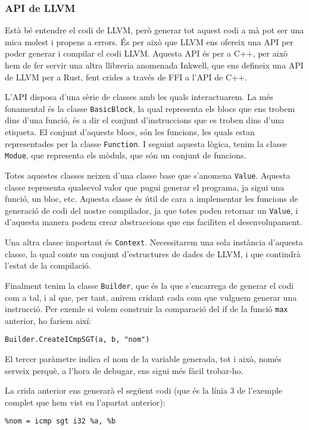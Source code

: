 ﻿\documentclass{article}
\begin{document}
\subsubsection{API de LLVM}
Està bé entendre el codi de LLVM, però generar tot aquest codi a mà pot ser una
mica molest i propens a errors. És per això que LLVM ens ofereix una API per
poder generar i compilar el codi LLVM. Aquesta API és per a C++, per això hem de 
fer servir una altra llibreria anomenada Inkwell, que ens defineix una API de 
LLVM per a Rust, fent crides a través de FFI a l'API de C++.

L'API disposa d'una sèrie de classes amb les quals interactuarem. La més 
fonamental és la classe \texttt{BasicBlock}, la qual representa els blocs que 
ens trobem dins d'una funció, és a dir el conjunt d'instruccions que es troben
dins d'una etiqueta. El conjunt d'aquests blocs, són les funcions, les quals
estan representades per la classe \texttt{Function}. I seguint aquesta lògica,
tenim la classe \texttt{Modue}, que representa els mòduls, que són un conjunt de
funcions.

Totes aquestes classes neixen d'una classe base que s'anomena \texttt{Value}. 
Aquesta classe representa qualsevol valor que pugui generar el programa, ja 
sigui una funció, un bloc, etc. Aquesta classe és útil de cara a implementar
les funcions de generació de codi del nostre compilador, ja que totes poden 
retornar un \texttt{Value}, i d'aquesta manera podem crear abstraccions que ens
faciliten el desenvolupament.

Una altra classe important és \texttt{Context}. Necessitarem una sola instància
d'aquesta classe, la qual conte un conjunt d'estructures de dades de LLVM, i que
contindrà l'estat de la compilació.

Finalment tenim la classe \texttt{Builder}, que és la que s'encarrega de generar
el codi com a tal, i al que, per tant, anirem cridant cada com que vulguem
generar una instrucció. Per exemle si volem construir la comparació del if de la
funció \texttt{max} anterior, ho fariem així: 

\texttt{Builder.CreateICmpSGT(a, b, "nom")}

El tercer paràmetre indica el nom de la variable generada, tot i això, només 
serveix perquè, a l'hora de debugar, ens sigui més fàcil trobar-ho.

La crida anterior ens generarà el següent codi (que és la línia 3 de l'exemple
complet que hem vist en l'apartat anterior):

\texttt{\%nom = icmp sgt i32 \%a, \%b}
\end{document}
